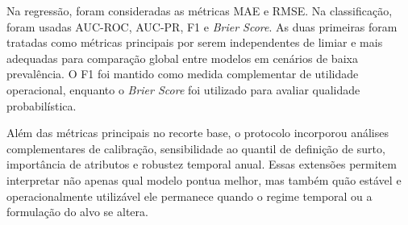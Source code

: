 
Na regress\~ao, foram consideradas as m\'etricas MAE e RMSE. Na classifica\c{c}\~ao, foram usadas AUC-ROC, AUC-PR, F1 e \textit{Brier Score}. As duas primeiras foram tratadas como m\'etricas principais por serem independentes de limiar e mais adequadas para compara\c{c}\~ao global entre modelos em cen\'arios de baixa preval\^encia. O F1 foi mantido como medida complementar de utilidade operacional, enquanto o \textit{Brier Score} foi utilizado para avaliar qualidade probabil\'istica.

Al\'em das m\'etricas principais no recorte base, o protocolo incorporou an\'alises complementares de calibra\c{c}\~ao, sensibilidade ao quantil de defini\c{c}\~ao de surto, import\^ancia de atributos e robustez temporal anual. Essas extens\~oes permitem interpretar n\~ao apenas qual modelo pontua melhor, mas tamb\'em qu\~ao est\'avel e operacionalmente utiliz\'avel ele permanece quando o regime temporal ou a formula\c{c}\~ao do alvo se altera.
